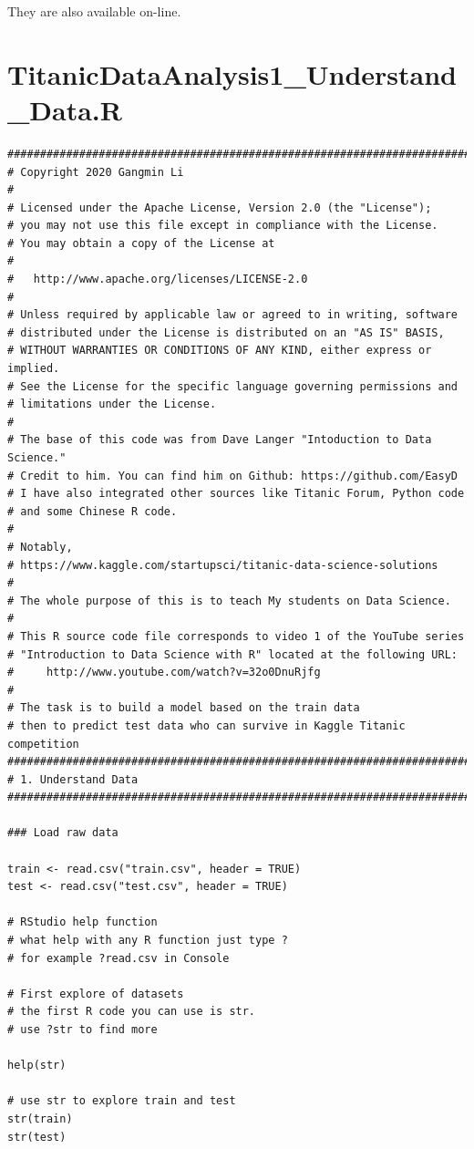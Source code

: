 \documentclass[
]{book}
\begin{document}
They are also available on-line.

\hypertarget{titanicdataanalysis1_understand_data.r}{%
\section*{TitanicDataAnalysis1\_Understand\_Data.R}\label{titanicdataanalysis1_understand_data.r}}


\begin{verbatim}
############################################################################
# Copyright 2020 Gangmin Li
#
# Licensed under the Apache License, Version 2.0 (the "License");
# you may not use this file except in compliance with the License.
# You may obtain a copy of the License at
#
#   http://www.apache.org/licenses/LICENSE-2.0
#
# Unless required by applicable law or agreed to in writing, software
# distributed under the License is distributed on an "AS IS" BASIS,
# WITHOUT WARRANTIES OR CONDITIONS OF ANY KIND, either express or implied.
# See the License for the specific language governing permissions and
# limitations under the License.
#
# The base of this code was from Dave Langer "Intoduction to Data Science."
# Credit to him. You can find him on Github: https://github.com/EasyD
# I have also integrated other sources like Titanic Forum, Python code
# and some Chinese R code.
#
# Notably,
# https://www.kaggle.com/startupsci/titanic-data-science-solutions
#
# The whole purpose of this is to teach My students on Data Science.
#
# This R source code file corresponds to video 1 of the YouTube series
# "Introduction to Data Science with R" located at the following URL:
#     http://www.youtube.com/watch?v=32o0DnuRjfg
#
# The task is to build a model based on the train data
# then to predict test data who can survive in Kaggle Titanic competition
##########################################################################
# 1. Understand Data
##########################################################################

### Load raw data

train <- read.csv("train.csv", header = TRUE)
test <- read.csv("test.csv", header = TRUE)

# RStudio help function
# what help with any R function just type ?
# for example ?read.csv in Console

# First explore of datasets
# the first R code you can use is str.
# use ?str to find more

help(str)

# use str to explore train and test
str(train)
str(test)


\end{verbatim}
\end{document}
